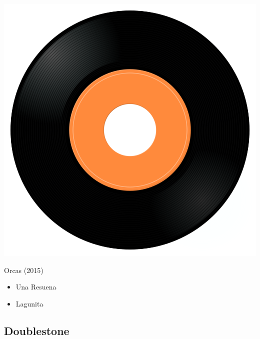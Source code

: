 \begin{minipage}[t]{0.25\textwidth}
\captionsetup{type=figure}
\includegraphics[width=\textwidth]{Images/cover.png}
\caption*{Orcas (2015)}
\end{minipage}
\begin{minipage}[t]{0.25\textwidth}\vspace{0pt}
\begin{itemize}[nosep,leftmargin=1em,labelwidth=*,align=left]
	\setlength{\itemsep}{0pt}
	\item Una Resuena
	\item Lagunita
\end{itemize}
\end{minipage}

\subsection{Doublestone}

